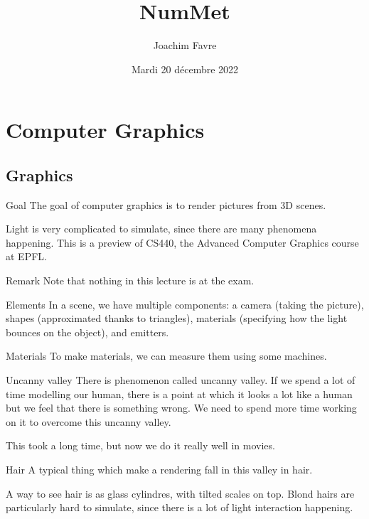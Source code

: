 \documentclass[a4paper]{article}
\title{NumMet}
\author{Joachim Favre}
\date{Mardi 20 décembre 2022}
\begin{document}
\maketitle


\section{Computer Graphics}
\subsection{Graphics}
\begin{parag}{Goal}
    The goal of computer graphics is to render pictures from 3D scenes.

    Light is very complicated to simulate, since there are many phenomena happening. This is a preview of CS440, the Advanced Computer Graphics course at EPFL.

    \begin{subparag}{Remark}
        Note that nothing in this lecture is at the exam.
    \end{subparag}
\end{parag}

\begin{parag}{Elements}
    In a scene, we have multiple components: a camera (taking the picture), shapes (approximated thanks to triangles), materials (specifying how the light bounces on the object), and emitters.
\end{parag}

\begin{parag}{Materials}
    To make materials, we can measure them using some machines.
\end{parag}

\begin{parag}{Uncanny valley}
    There is phenomenon called uncanny valley. If we spend a lot of time modelling our human, there is a point at which it looks a lot like a human but we feel that there is something wrong. We need to spend more time working on it to overcome this uncanny valley.

    This took a long time, but now we do it really well in movies.

    \begin{subparag}{Hair}
        A typical thing which make a rendering fall in this valley in hair.

        A way to see hair is as glass cylindres, with tilted scales on top. Blond hairs are particularly hard to simulate, since there is a lot of light interaction happening.
    \end{subparag}
\end{parag}
\end{document}
